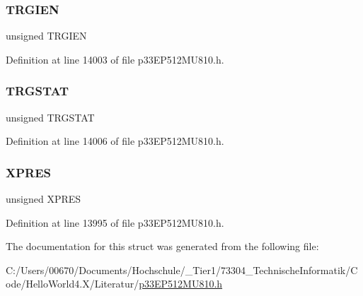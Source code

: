 \subsubsection{\texorpdfstring{T\+R\+G\+I\+EN}{TRGIEN}}
{\footnotesize\ttfamily unsigned T\+R\+G\+I\+EN}



Definition at line 14003 of file p33\+E\+P512\+M\+U810.\+h.

\mbox{\label{structtag_p_w_m_c_o_n1_b_i_t_s_a57c6135a12bae69a2a2cac5ed50a4a6d}} 
\subsubsection{\texorpdfstring{T\+R\+G\+S\+T\+AT}{TRGSTAT}}
{\footnotesize\ttfamily unsigned T\+R\+G\+S\+T\+AT}



Definition at line 14006 of file p33\+E\+P512\+M\+U810.\+h.

\mbox{\label{structtag_p_w_m_c_o_n1_b_i_t_s_a6a3f824223966417e0005dbe08b1833c}} 
\subsubsection{\texorpdfstring{X\+P\+R\+ES}{XPRES}}
{\footnotesize\ttfamily unsigned X\+P\+R\+ES}



Definition at line 13995 of file p33\+E\+P512\+M\+U810.\+h.



The documentation for this struct was generated from the following file\+:\begin{DoxyCompactItemize}
\item 
C\+:/\+Users/00670/\+Documents/\+Hochschule/\+\_\+\+Tier1/73304\+\_\+\+Technische\+Informatik/\+Code/\+Hello\+World4.\+X/\+Literatur/\hyperlink{p33_e_p512_m_u810_8h}{p33\+E\+P512\+M\+U810.\+h}\end{DoxyCompactItemize}
